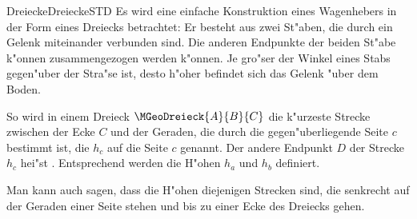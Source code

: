 \begin{MXContent}{Dreiecke}{Dreiecke}{STD}
Es wird eine einfache Konstruktion eines Wagenhebers in der Form eines
Dreiecks betrachtet: Er besteht aus zwei St"aben, die durch ein Gelenk 
miteinander verbunden sind. Die anderen Endpunkte der beiden St"abe k"onnen
zusammengezogen werden k"onnen.
Je gro"ser der Winkel eines Stabs gegen"uber der Stra"se ist, desto 
h"oher befindet sich das Gelenk "uber dem Boden.
\begin{center}
\end{center}
So wird in einem Dreieck $\MGeoDreieck{A}{B}{C}$ die k"urzeste Strecke 
zwischen der Ecke $C$ und der Geraden, die durch die gegen"uberliegende 
Seite $c$ bestimmt ist, die 
 $h_c$ auf 
die Seite $c$ genannt. Der andere Endpunkt $D$ der Strecke $h_c$ hei"st 
.
Entsprechend werden die H"ohen $h_a$ und $h_b$ definiert.

Man kann auch sagen, dass die H"ohen diejenigen Strecken sind, die senkrecht 
auf der Geraden einer Seite stehen und bis zu einer Ecke des Dreiecks gehen.
\end{MXContent}


